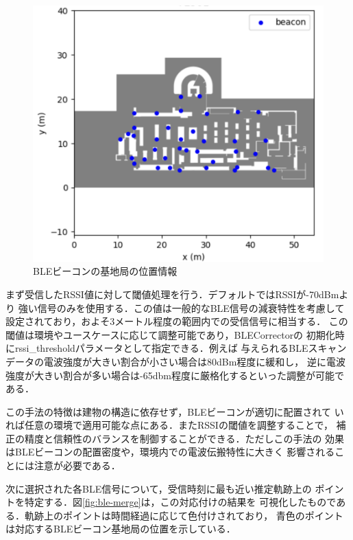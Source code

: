 \begin{figure}[H]
	\centering
	\includegraphics[width=\linewidth]{image/ble-beacon-position.jpg}
	\caption{BLEビーコンの基地局の位置情報}    \label{fig:ble-beacon-position}
\end{figure}

まず受信したRSSI値に対して閾値処理を行う．デフォルトではRSSIが-70dBmより
強い信号のみを使用する．この値は一般的なBLE信号の減衰特性を考慮して
設定されており，およそ3メートル程度の範囲内での受信信号に相当する．
この閾値は環境やユースケースに応じて調整可能であり，BLECorrectorの
初期化時にrssi\_thresholdパラメータとして指定できる．例えば
与えられるBLEスキャンデータの電波強度が大きい割合が小さい場合は80dBm程度に緩和し，
逆に電波強度が大きい割合が多い場合は-65dbm程度に厳格化するといった調整が可能である．

この手法の特徴は建物の構造に依存せず，BLEビーコンが適切に配置されて
いれば任意の環境で適用可能な点にある．またRSSIの閾値を調整することで，
補正の精度と信頼性のバランスを制御することができる．ただしこの手法の
効果はBLEビーコンの配置密度や，環境内での電波伝搬特性に大きく
影響されることには注意が必要である．

次に選択された各BLE信号について，受信時刻に最も近い推定軌跡上の
ポイントを特定する．図\ref{fig:ble-merge}は，この対応付けの結果を
可視化したものである．軌跡上のポイントは時間経過に応じて色付けされており，
青色のポイントは対応するBLEビーコン基地局の位置を示している．


